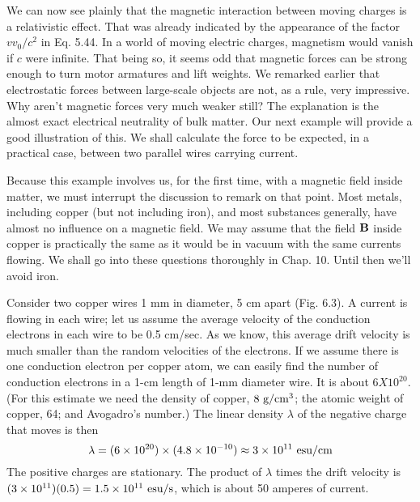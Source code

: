 We can now see plainly that the magnetic interaction between
moving charges is a relativistic effect. That was already indicated
by the appearance of the factor $vv_0/c^2$ in Eq. 5.44. In a world of
moving electric charges, magnetism would vanish if $c$ were infinite.
That being so, it seems odd that magnetic forces can be strong enough
to turn motor armatures and lift weights. We remarked earlier that
electrostatic forces between large-scale objects are not, as a rule, very
impressive. Why aren't magnetic forces very much weaker still?
The explanation is the almost exact electrical neutrality of bulk
matter. Our next example will provide a good illustration of this.
We shall calculate the force to be expected, in a practical case, between
two parallel wires carrying current.

Because this example involves us, for the first time, with a magnetic
field inside matter, we must interrupt the discussion to remark on
that point. Most metals, including copper (but not including iron),
and most substances generally, have almost no influence on a magnetic
field. We may assume that the field $\mathbf{B}$ inside copper is practically
the same as it would be in vacuum with the same currents
flowing. We shall go into these questions thoroughly in Chap. 10.
Until then we'll avoid iron.

Consider two copper wires 1 mm in diameter, 5 cm apart (Fig. 6.3).
A current is flowing in each wire; let us assume the average velocity
of the conduction electrons in each wire to be 0.5 cm/sec. As we
know, this average drift velocity is much smaller than the random
velocities of the electrons. If we assume there is one conduction
electron per copper atom, we can easily find the number of conduction
electrons in a 1-cm length of 1-mm diameter wire. It is about
$6 X 10^{20}$. (For this estimate we need the density of copper,
$8\ \textup{g}/\textup{cm}^3$; the atomic weight of copper, 64; and Avogadro's
number.) The linear density $\lambda$ of the negative charge that moves is
then
\begin{equation}
  \lambda = (6\times 10^{20})\times(4.8\times 10^{-10})\approx 3\times10^{11}\ \textup{esu}/\textup{cm}
\end{equation}
The positive charges are stationary. The product of $\lambda$ times the drift
velocity is $(3\times10^{11})(0.5) = 1.5 \times 10^{11}\ \esu/\sunit$, which is about
50 amperes of current.

